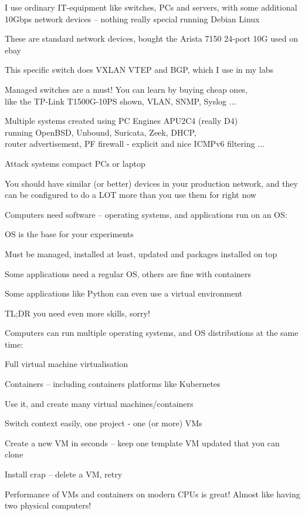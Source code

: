 \documentclass[Screen16to9,17pt]{foils}
\begin{document}


I use ordinary IT-equipment like switches, PCs and servers, with some additional 10Gbps network devices -- nothing really special running Debian Linux

\begin{list2}
\item These are standard network devices, bought the Arista 7150 24-port 10G used on ebay
\item This specific switch does VXLAN VTEP and BGP, which I use in my labs
\item Managed switches are a must! You can learn by buying cheap ones,\\
like the TP-Link T1500G-10PS  shown, VLAN, SNMP, Syslog ...
\item Multiple systems created using PC Engines APU2C4 (really D4)\\
running OpenBSD, Unbound, Suricata, Zeek, DHCP, \\
router advertisement, PF firewall - explicit and nice ICMPv6 filtering ...
\item Attack systems compact PCs or laptop
\end{list2}

You should have similar (or better) devices in your production network, and they can be
configured to do a LOT more than you use them for right now



Computers need software -- operating systems, and applications run on an OS:
\begin{list2}
\item OS is the base for your experiments
\item Must be managed, installed at least, updated and packages installed on top
\item Some applications need a regular OS, others are fine with containers
\item Some applications like Python can even use a virtual environment
\end{list2}

TL;DR you need even more skills, sorry!



Computers can run multiple operating systems, and OS distributions at the same time:
\begin{list2}
\item Full virtual machine virtualisation
\item Containers -- including containers platforms like Kubernetes
\item Use it, and create many virtual machines/containers
\item Switch context easily, one project - one (or more) VMs
\item Create a new VM in seconds -- keep one template VM updated that you can clone
\item Install crap -- delete a VM, retry
\item Performance of VMs and containers on modern CPUs is great! Almost like having two physical computers!
\end{list2}
\end{document}
